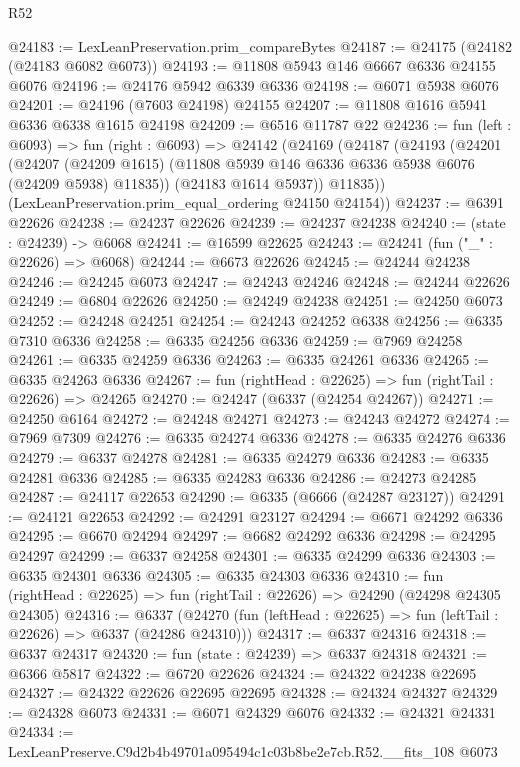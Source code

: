 \begin{lexlean}{R52}
\begin{coremodule}
@24183 := LexLeanPreservation.prim_compareBytes
@24187 := @24175 (@24182 (@24183 @6082 @6073))
@24193 := @11808 @5943 @146 @6667 @6336 @24155 @6076
@24196 := @24176 @5942 @6339 @6336
@24198 := @6071 @5938 @6076
@24201 := @24196 (@7603 @24198) @24155
@24207 := @11808 @1616 @5941 @6336 @6338 @1615 @24198
@24209 := @6516 @11787 @22
@24236 := fun (left : @6093) =>
  fun (right : @6093) =>
  @24142
    (@24169
      (@24187
        (@24193
          (@24201
            (@24207
              (@24209 @1615)
              (@11808 @5939 @146 @6336 @6336 @5938 @6076 (@24209 @5938) @11835))
            (@24183 @1614 @5937))
          @11835))
      (LexLeanPreservation.prim_equal_ordering @24150 @24154))
@24237 := @6391 @22626
@24238 := @24237 @22626
@24239 := @24237 @24238
@24240 := (state : @24239) -> @6068
@24241 := @16599 @22625
@24243 := @24241 (fun ("_" : @22626) => @6068)
@24244 := @6673 @22626
@24245 := @24244 @24238
@24246 := @24245 @6073
@24247 := @24243 @24246
@24248 := @24244 @22626
@24249 := @6804 @22626
@24250 := @24249 @24238
@24251 := @24250 @6073
@24252 := @24248 @24251
@24254 := @24243 @24252 @6338
@24256 := @6335 @7310 @6336
@24258 := @6335 @24256 @6336
@24259 := @7969 @24258
@24261 := @6335 @24259 @6336
@24263 := @6335 @24261 @6336
@24265 := @6335 @24263 @6336
@24267 := fun (rightHead : @22625) => fun (rightTail : @22626) => @24265
@24270 := @24247 (@6337 (@24254 @24267))
@24271 := @24250 @6164
@24272 := @24248 @24271
@24273 := @24243 @24272
@24274 := @7969 @7309
@24276 := @6335 @24274 @6336
@24278 := @6335 @24276 @6336
@24279 := @6337 @24278
@24281 := @6335 @24279 @6336
@24283 := @6335 @24281 @6336
@24285 := @6335 @24283 @6336
@24286 := @24273 @24285
@24287 := @24117 @22653
@24290 := @6335 (@6666 (@24287 @23127))
@24291 := @24121 @22653
@24292 := @24291 @23127
@24294 := @6671 @24292 @6336
@24295 := @6670 @24294
@24297 := @6682 @24292 @6336
@24298 := @24295 @24297
@24299 := @6337 @24258
@24301 := @6335 @24299 @6336
@24303 := @6335 @24301 @6336
@24305 := @6335 @24303 @6336
@24310 := fun (rightHead : @22625) => fun (rightTail : @22626) => @24290 (@24298 @24305 @24305)
@24316 := @6337
    (@24270 (fun (leftHead : @22625) => fun (leftTail : @22626) => @6337 (@24286 @24310)))
@24317 := @6337 @24316
@24318 := @6337 @24317
@24320 := fun (state : @24239) => @6337 @24318
@24321 := @6366 @5817
@24322 := @6720 @22626
@24324 := @24322 @24238 @22695
@24327 := @24322 @22626 @22695 @22695
@24328 := @24324 @24327
@24329 := @24328 @6073
@24331 := @6071 @24329 @6076
@24332 := @24321 @24331
@24334 := LexLeanPreserve.C9d2b4b49701a095494c1c03b8be2e7cb.R52.__fits_108 @6073

\end{coremodule}
\end{lexlean}
